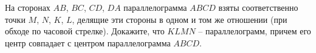 \begin{ex}
	\begin{condition}
		На сторонах \( AB \), \( BC \), \( CD \), \( DA  \) параллелограмма	\( ABCD  \) взяты соответственно точки \( M  \), \( N  \), \( K \), \( L \), делящие эти стороны в одном и том же отношении (при обходе по часовой стрелке). Докажите, что \( KLMN \) – параллелограмм, причем	его центр совпадает с центром параллелограмма \( ABCD \).
	\end{condition}
\end{ex}